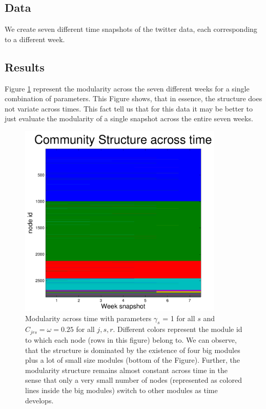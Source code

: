 \documentclass[12pt]{article}
\begin{document}
\subsection{Data}

We create seven different time snapshots of the twitter data, each corresponding to a different week.

\subsection{Results}

Figure \ref{fig.time.modular} represent the modularity across the
seven different weeks for a single combination of parameters. This Figure shows, that in essence, the
structure does not variate across times. This fact tell us that
for this data it may be better to just evaluate the modularity
of a single snapshot across the entire seven weeks. 

\begin{figure}
	\centering
	\includegraphics[width=0.87\textwidth]{Figures/modularity_time}
	\caption{Modularity across time with parameters
		$\gamma_s$ = 1 for all $s$ and $C_{jrs} = \omega=0.25$ for
		all $j,s,r$.
		 Different colors represent
		the module id to which each node (rows in this figure)
		belong to. We can observe, that the structure is dominated
		by the existence of four big modules plus a lot of small
		size modules (bottom of the Figure). Further, the modularity
		structure remains almost constant across time in the sense
		that only a very small number of nodes (represented as colored
		lines inside the big modules) switch to other modules as
		time develops.}
	\label{fig.time.modular}
\end{figure}
	




\end{document}

